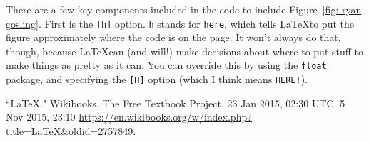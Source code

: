 \documentclass[12pt]{article}
\begin{document}
	There are a few key components included in the code to include Figure~\ref{fig: ryan gosling}. First is the \verb|[h]| option. \texttt{h} stands for \texttt{here}, which tells \LaTeX to put the figure approximately where the code is on the page. It won't always do that, though, because \LaTeX can (and will!) make decisions about where to put stuff to make things as pretty as it can. You can override this by using the \texttt{float} package, and specifying the \verb|[H]| option (which I think means \texttt{HERE!}).
	
	\begin{thebibliography}{99}
		 ``LaTeX." Wikibooks, The Free Textbook Project. 23 Jan 2015, 02:30 UTC. 5 Nov 2015, 23:10 \url{https://en.wikibooks.org/w/index.php?title=LaTeX&oldid=2757849}.
	\end{thebibliography}
	
\end{document}
